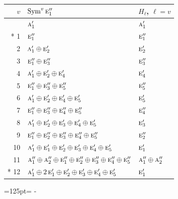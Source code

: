 \documentclass[10pt,a4paper]{article}
\newcommand{\needspace}[1]{\par\penalty-100\begingroup\dimen0=#1\relax\dimen2=\pagegoal
  \advance\dimen2-\pagetotal\ifdim\dimen0>\dimen2\relax\ifdim\dimen2>0pt\vfil\break\fi\fi
  \endgroup}
\numberwithin{equation}{section}
\newcommand{\irr}[1]{\text{\normalfont\scshape #1}}
\begin{document}
{\small\begin{longtable}{@{}rll@{}}\toprule
$v$ & $\operatorname{Sym}^{v}\irr{e}_{1}''$ & $H_\ell$, $\ell = v$\\\midrule\endhead
\bottomrule\endfoot\endlastfoot
0 & $\irr{a}_{1}'$ & $\irr{a}_{1}'$\\*
1 & $\irr{e}_{1}''$ & $\irr{e}_{1}''$\\
2 & $\irr{a}_{1}' \oplus \irr{e}_{2}'$ & $\irr{e}_{2}'$\\
3 & $\irr{e}_{1}'' \oplus \irr{e}_{3}''$ & $\irr{e}_{3}''$\\
4 & $\irr{a}_{1}' \oplus \irr{e}_{2}' \oplus \irr{e}_{4}'$ & $\irr{e}_{4}'$\\
5 & $\irr{e}_{1}'' \oplus \irr{e}_{3}'' \oplus \irr{e}_{5}''$ & $\irr{e}_{5}''$\\
6 & $\irr{a}_{1}' \oplus \irr{e}_{2}' \oplus \irr{e}_{4}' \oplus \irr{e}_{5}'$ & $\irr{e}_{5}'$\\
7 & $\irr{e}_{1}'' \oplus \irr{e}_{3}'' \oplus \irr{e}_{4}'' \oplus \irr{e}_{5}''$ & $\irr{e}_{4}''$\\
8 & $\irr{a}_{1}' \oplus \irr{e}_{2}' \oplus \irr{e}_{3}' \oplus \irr{e}_{4}' \oplus \irr{e}_{5}'$ & $\irr{e}_{3}'$\\
9 & $\irr{e}_{1}'' \oplus \irr{e}_{2}'' \oplus \irr{e}_{3}'' \oplus \irr{e}_{4}'' \oplus \irr{e}_{5}''$ & $\irr{e}_{2}''$\\
10 & $\irr{a}_{1}' \oplus \irr{e}_{1}' \oplus \irr{e}_{2}' \oplus \irr{e}_{3}' \oplus \irr{e}_{4}' \oplus \irr{e}_{5}'$ & $\irr{e}_{1}'$\\
11 & $\irr{a}_{1}'' \oplus \irr{a}_{2}'' \oplus \irr{e}_{1}'' \oplus \irr{e}_{2}'' \oplus \irr{e}_{3}'' \oplus \irr{e}_{4}'' \oplus \irr{e}_{5}''$ & $\irr{a}_{1}'' \oplus \irr{a}_{2}''$\\*
12 & $\irr{a}_{1}' \oplus 2\,\irr{e}_{1}' \oplus \irr{e}_{2}' \oplus \irr{e}_{3}' \oplus \irr{e}_{4}' \oplus \irr{e}_{5}'$ & $\irr{e}_{1}'$\\
\bottomrule\end{longtable}}
\needspace{125pt}
\end{document}
